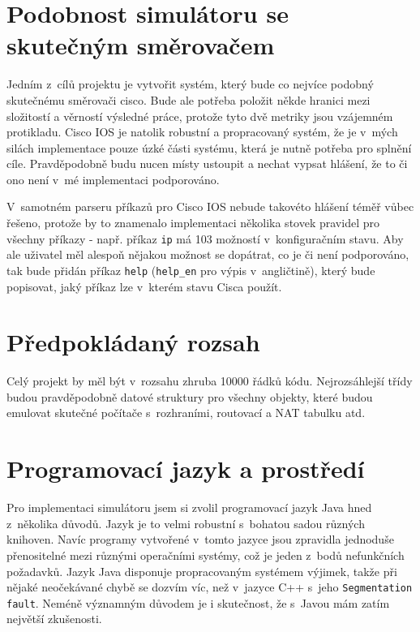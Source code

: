 
\section{Podobnost simulátoru se skutečným směrovačem}\label{kap:podobnost}
Jedním z~cílů projektu je vytvořit systém, který bude co nejvíce podobný skutečnému směrovači cisco. Bude ale potřeba položit někde hranici mezi složitostí a věrností výsledné práce, protože tyto dvě metriky jsou vzájemném protikladu. Cisco IOS je natolik robustní a propracovaný systém, že je v~mých silách implementace pouze úzké části systému, která je nutně potřeba pro splnění cíle. Pravděpodobně budu nucen místy ustoupit a nechat vypsat hlášení, že to či ono není v~mé implementaci podporováno. 

V~samotném parseru příkazů pro Cisco IOS nebude takovéto hlášení téměř vůbec řešeno, protože by to znamenalo implementaci několika stovek pravidel pro všechny příkazy - např. příkaz \verb|ip| má 103 možností v~konfiguračním stavu. Aby ale uživatel měl alespoň nějakou možnost se dopátrat, co je či není podporováno, tak bude přidán příkaz \verb|help| (\verb|help_en| pro výpis v~angličtině), který bude popisovat, jaký příkaz lze v~kterém stavu Cisca použít.


\section{Předpokládaný rozsah}
Celý projekt by měl být v~rozsahu zhruba 10000 řádků kódu. Nejrozsáhlejší třídy budou pravděpodobně datové struktury pro všechny objekty, které budou emulovat skutečné počítače s~rozhraními, routovací a NAT tabulku atd.


\section{Programovací jazyk a prostředí}
Pro implementaci simulátoru jsem si zvolil programovací jazyk Java hned z~několika důvodů. Jazyk je to velmi robustní s~bohatou sadou různých knihoven. Navíc programy vytvořené v~tomto jazyce jsou zpravidla jednoduše přenositelné mezi různými operačními systémy, což je jeden z~bodů nefunkčních požadavků. Jazyk Java disponuje propracovaným systémem výjimek, takže při nějaké neočekávané chybě se dozvím víc, než v~jazyce C++ s~jeho \verb|Segmentation fault|. Neméně významným důvodem je i skutečnost, že s~Javou mám zatím největší zkušenosti.

